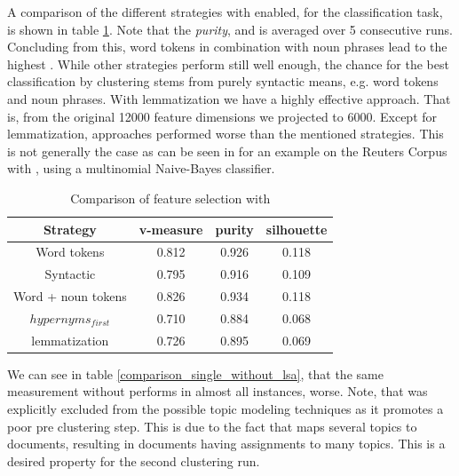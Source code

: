 A comparison of the different strategies with \lsa{} enabled, for the classification task, is shown in table \ref{comparison_single_with_lsa}. Note that the \emph{purity}, \vmeasure{} and \silco{} is averaged over 5 consecutive runs. Concluding from this, word tokens in combination with noun phrases lead to the highest \vmeasure{}. While other strategies perform still well enough, the chance for the best classification by clustering stems from purely syntactic means, e.g. word tokens and noun phrases. With \wordnet{} lemmatization we have a highly effective approach. That is, from the original 12000 feature dimensions we projected to 6000. Except for lemmatization, \wordnet{} approaches performed worse than the mentioned strategies. This is not generally the case as can be seen in \cite{TopicClassificationReuters2002} for an example on the Reuters Corpus with \wordnet{}, using a multinomial Naive-Bayes classifier.

  \begin{table}[h!]\label{comparison_single_with_lsa}
    \begin{tabular}{ c | c | c | c }
      Strategy    & v-measure & purity  & silhouette \\ \hline
      Word tokens & 0.812     & 0.926   & 0.118      \\
      Syntactic   & 0.795     & 0.916     & 0.109 \\
      Word + noun tokens & 0.826   & 0.934     & 0.118 \\
      \wordnet{} $hypernyms_{first}$ & 0.710   & 0.884     & 0.068 \\
      \wordnet{} lemmatization   & 0.726   & 0.895     & 0.069 \\
    \end{tabular}
    \caption{Comparison of feature selection with \lsa{}}
  \end{table}

We can see in table \ref{comparison_single_without_lsa}, that the same measurement without \lsa{} performs in almost all instances, worse. Note, that \lda{} was explicitly excluded from the possible topic modeling techniques as it promotes a poor pre clustering step. This is due to the fact that \lda{} maps several topics to documents, resulting in documents having assignments to many topics. This is a desired property for the second clustering run.

